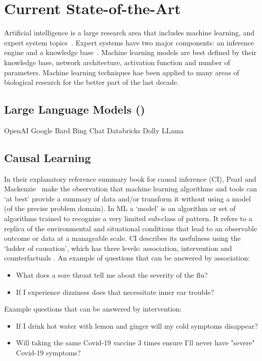\section{Current State-of-the-Art}

Artificial intelligence is a large research area that includes machine learning, and expert system topics~\cite{RussellNorvig:2016}.
Expert systems have two major components: an inference engine and a knowledge base~\cite{Liao:2005,Tan:2017}.
Machine learning models are best defined by their knowledge base, network architecture, activation function and number of parameters.
Machine learning techniques hae been applied to many areas of biological research \cite{Deng:2011,Angermueller:2016,Gawehn:2016_deep,Min:2017,Miotto:2018:deep,Tran:2018,Toh:2019,Zhang:2019,Bouwmeester:2020,Wen:2020:deep,Caudai:2021,Talukder:2021,Hassabis:2022} for the better part of the last decade.

\subsection{Large Language Models (\llms)}
OpenAI
Google Bard
Bing Chat
Databricks Dolly
LLama

\subsection{Causal Learning}
In their explanatory reference summary book for causal inference (CI), Pearl and Mackenzie~\cite{Pearl:2018} make the observation that machine learning algorithms and tools can `at best' provide a summary of data and/or transform it without using a model (of the precise problem domain).
In ML a `model' is an algorithm or set of algorithms trained to recognize a very limited sub-class of pattern.
It refers to a replica of the environmental and situational conditions that lead to an observable outcome or data at a manageable scale.
CI describes its usefulness using the `ladder of causation', which has three levels: association, intervention and counterfactuals \cite{Pearl:2018}.
An example of questions that can be answered by association:
\begin{itemize}
    \item What does a sore throat tell me about the severity of the flu?
    \item If I experience dizziness does that necessitate inner ear trouble?
\end{itemize}

Example questions that can be answered by intervention:
\begin{itemize}
    \item If I drink hot water with lemon and ginger will my cold symptoms disappear?
    \item Will taking the same Covid-19 vaccine 3 times ensure I'll never have "severe" Covid-19 symptoms?
\end{itemize}

